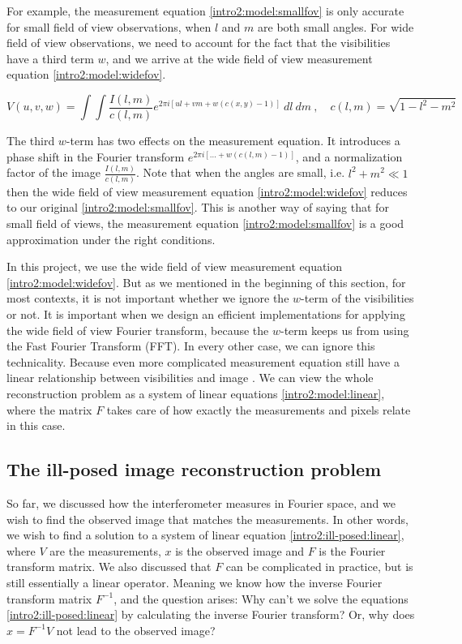 For example, the measurement equation \eqref{intro2:model:smallfov} is only accurate for small field of view observations, when $l$ and $m$ are both small angles. For wide field of view observations, we need to account for the fact that the visibilities have a third term $w$, and we arrive at the wide field of view measurement equation \eqref{intro2:model:widefov}.
 
\begin{equation}\label{intro2:model:widefov}
 V(u, v, w) = \int\int  \frac{I(l, m)}{c(l, m)}  e^{2 \pi i [ul+vm+ w(c(x, y) - 1)]} \: dl \: dm \:,  \quad c(l,m) = \sqrt{1 - l^2 - m ^2}
\end{equation}
 
The third $w$-term has two effects on the measurement equation. It introduces a phase shift in the Fourier transform $e^{2 \pi i [\ldots +w(c(l, m) - 1)]}$, and a normalization factor of the image $\frac{I(l, m)}{c(l, m)}$. Note that when the angles are small, i.e. $l^2 +m^2 \ll 1$ then the wide field of view measurement equation \eqref{intro2:model:widefov} reduces to our original \eqref{intro2:model:smallfov}. This is another way of saying that for small field of views, the measurement equation \eqref{intro2:model:smallfov} is a good approximation under the right conditions. 

In this project, we use the wide field of view measurement equation \eqref{intro2:model:widefov}. But as we mentioned in the beginning of this section, for most contexts, it is not important whether we ignore the $w$-term of the visibilities or not. It is important when we design an efficient implementations for applying the wide field of view Fourier transform, because the $w$-term keeps us from using the Fast Fourier Transform (FFT). In every other case, we can ignore this technicality. Because even more complicated measurement equation still have a linear relationship between visibilities and image \cite{smirnov2011revisiting1, smirnov2011revisiting2, smirnov2011revisiting3, smirnov2011revisiting4}. We can view the whole reconstruction problem as a system of linear equations \eqref{intro2:model:linear}, where the matrix $F$ takes care of how exactly the measurements and pixels relate in this case.

\subsection{The ill-posed image reconstruction problem}\label{intro2:ill-posed}
So far, we discussed how the interferometer measures in Fourier space, and we wish to find the observed image that matches the measurements. In other words, we wish to find a solution to a system of linear equation \eqref{intro2:ill-posed:linear}, where $V$ are the measurements, $x$ is the observed image and $F$ is the Fourier transform matrix. We also discussed that $F$ can be complicated in practice, but is still essentially a linear operator. Meaning we know how the inverse Fourier transform matrix $F^{-1}$, and the question arises: Why can't we solve the equations \eqref{intro2:ill-posed:linear} by calculating the inverse Fourier transform? Or, why does $x = F^{-1} V$ not lead to the observed image?

